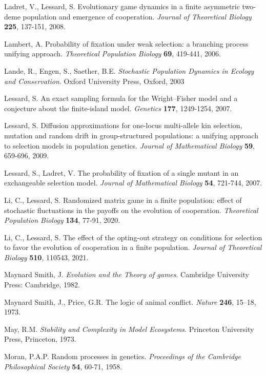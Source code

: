 \documentclass[11pt]{article}
\begin{document}
\begin{thebibliography}{99}
Ladret, V., Lessard, S. Evolutionary game dynamics in a finite asymmetric two-deme population and emergence of cooperation. {\it Journal of Theoretical Biology} {\bf 225}, 137-151, 2008.

Lambert, A. Probability of fixation under weak selection: a branching process unifying approach. {\it Theoretical Population Biology}  {\bf 69}, 419-441, 2006.


Lande, R., Engen, S., Saether, B.E. {\it Stochastic Population Dynamics in Ecology and Conservation}. Oxford University Press, Oxford, 2003

Lessard, S. An exact sampling formula for the Wright–Fisher model and a conjecture about the finite-island model. {\it Genetics} {\bf 177}, 1249-1254, 2007.

Lessard, S. Diffusion approximations for one-locus multi-allele kin selection, mutation and random drift in group-structured populations: a unifying approach to selection models in population genetics. {\it Journal of Mathematical Biology} {\bf 59}, 659-696, 2009.

Lessard, S., Ladret, V. The probability of fixation of a single mutant in an exchangeable selection model. {\it Journal of Mathematical Biology} {\bf 54}, 721-744, 2007.


Li, C., Lessard, S. Randomized matrix game in a finite population: effect of stochastic fluctuations in the payoffs on the evolution of cooperation. {\it Theoretical Population Biology} {\bf 134}, 77-91, 2020.

Li, C., Lessard, S. The effect of the opting-out strategy on conditions for selection to favor the evolution of cooperation in a finite population. {\it Journal of Theoretical Biology} {\bf 510}, 110543, 2021.



Maynard Smith, J. {\em Evolution and the Theory of games}. Cambridge University Press: Cambridge, 1982. 

Maynard Smith, J., Price, G.R. The logic of animal conflict. {\em Nature} {\bf 246}, 15--18, 1973.




May, R.M. {\it Stability and Complexity in Model Ecosystems}. Princeton University Press, Princeton, 1973.

Moran, P.A.P. Random processes in genetics. {\it Proceedings of the Cambridge Philosophical Society} {\bf 54}, 60-71, 1958.









\end{thebibliography}
\end{document}

